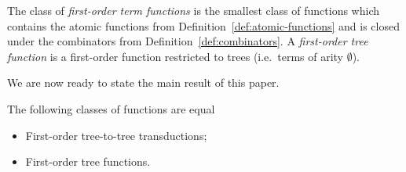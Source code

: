 \begin{definition} \label{def:fo-tree-functions} The class of \emph{first-order term functions} is the smallest class of functions which contains the atomic functions from Definition~\ref{def:atomic-functions} and is closed under the combinators from Definition~\ref{def:combinators}. A \emph{first-order tree function} is a first-order function restricted to trees (i.e.~terms of arity $\emptyset$).
\end{definition}


We are now ready to state the main result of this paper. 
\begin{theorem}\label{thm:main}
    The following classes of functions are equal\begin{itemize}
        \item First-order tree-to-tree transductions;
        \item First-order tree functions.
    \end{itemize}
\end{theorem}
